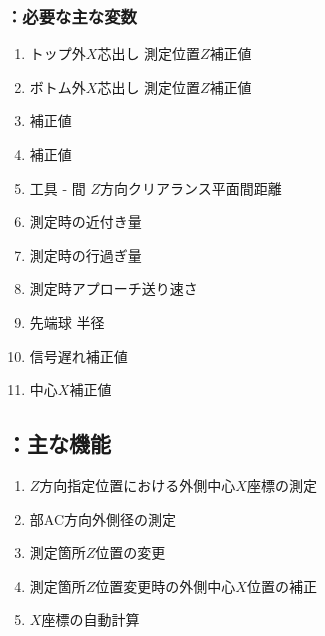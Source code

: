 \subsubsection{\MXOThickness：必要な主な変数}
\begin{enumerate}[label*=\sarrow]
\item トップ外$X$芯出し 測定位置$Z$補正値
\item ボトム外$X$芯出し 測定位置$Z$補正値
\item \KeywayPos 補正値
\item \KeywayWidth 補正値
\item 工具 - \EndFace 間 $Z$方向クリアランス平面間距離
\item \TouchSensorProbe 測定時の近付き量
\item \TouchSensorProbe 測定時の行過ぎ量
\item \TouchSensorProbe 測定時アプローチ送り速さ
\item \TouchSensorProbe 先端球 半径
\item \TouchSensorProbe 信号遅れ補正値
\item \TouchSensorProbe 中心$X$補正値
\end{enumerate}


\clearpage
\subsection{\MXOThickness：主な機能}
\begin{enumerate}[label*=\sarrow]
\item $Z$方向指定位置における外側中心$X$座標の測定
\item \EndFace 部AC方向外側径の測定
\item 測定箇所$Z$位置の変更
\item 測定箇所$Z$位置変更時の外側中心$X$位置の補正
\item \KeywayCenter$X$座標の自動計算
\end{enumerate}


